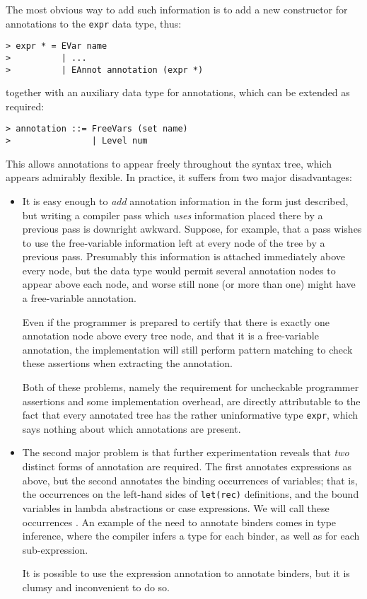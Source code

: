 The most obvious way to add such information is to add a new
constructor for annotations to the \mbox{\tt expr} data type, thus:
\begin{verbatim}
> expr * = EVar name
>          | ...
>          | EAnnot annotation (expr *)
\end{verbatim}
%
%
together with an auxiliary data type for annotations, which can be
extended as required:
\begin{verbatim}
> annotation ::= FreeVars (set name)
>                | Level num
\end{verbatim}
%
%
%
This allows annotations to appear freely throughout the syntax tree,
which appears admirably flexible.  In practice, it suffers from two
major disadvantages:
\begin{itemize}
\item
It is easy enough to {\em add\/} annotation information in the form just
described, but writing a compiler pass which {\em uses\/} information
placed there by a previous pass is downright awkward.  Suppose, for
example, that a pass wishes to use the free-variable information left
at every node of the tree by a previous pass. Presumably this
information is attached immediately above every node, but the data
type would permit several annotation nodes to appear above each node,
and worse still none (or more than one) might have a free-variable
annotation.

Even if the programmer is prepared to certify that there is exactly
one annotation node above every tree node, and that it is a
free-variable annotation, the implementation will still perform
pattern matching to check these assertions when extracting the
annotation.

Both of these problems, namely the requirement for uncheckable
programmer assertions and some implementation overhead, are directly
attributable to the fact that every annotated tree has the rather
uninformative type \mbox{\tt expr}, which says nothing about which
annotations are present.

\item The second major problem is that further experimentation reveals
that {\em two\/} distinct forms of annotation are required.  The first
annotates expressions as above, but the second annotates the binding
occurrences of variables; that is, the occurrences on the left-hand
sides of \mbox{\tt let(rec)} definitions, and the bound variables in lambda
abstractions or case expressions.  We will call these occurrences
.  An example of the need to annotate binders comes
in type inference, where the compiler infers a type for each
binder, as well as for each sub-expression.

It is possible to use the expression annotation to annotate binders,
but it is clumsy and inconvenient to do so.
\end{itemize}

